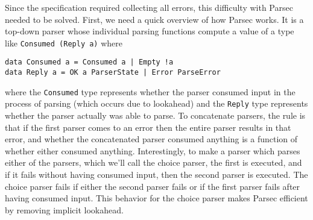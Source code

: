 \documentclass[11pt]{article}
\begin{document}
Since the specification required collecting all errors, this
difficulty with Parsec needed to be solved.  First, we need a quick
overview of how Parsec works.  It is a top-down parser whose
individual parsing functions compute a value of a type like
\texttt{Consumed (Reply a)} where
\begin{verbatim}
data Consumed a = Consumed a | Empty !a
data Reply a = OK a ParserState | Error ParseError
\end{verbatim}
where the \texttt{Consumed} type represents whether the parser
consumed input in the process of parsing (which occurs due to
lookahead) and the \texttt{Reply} type represents whether the parser
actually was able to parse.  To concatenate parsers, the rule is that
if the first parser comes to an error then the entire parser results
in that error, and whether the concatenated parser consumed anything
is a function of whether either consumed anything.  Interestingly, to
make a parser which parses either of the parsers, which we'll call the
choice parser, the first is executed, and if it fails without having
consumed input, then the second parser is executed.  The choice parser
fails if either the second parser fails or if the first parser fails
after having consumed input.  This behavior for the choice parser
makes Parsec efficient by removing implicit lookahead.
\end{document}
